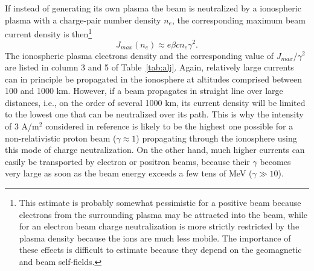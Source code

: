 \documentclass [12pt,a4paper,     ]{report} %
\begin{document}
  If instead of generating its own plasma the beam is neutralized by a ionospheric plasma with a charge-pair number density $n_e$, the corresponding maximum beam current density is then\footnote{This estimate is probably somewhat pessimistic for a positive beam because electrons from the surrounding plasma may be attracted into the beam, while for an electron beam charge neutralization is more strictly restricted by the plasma density because the ions are much less mobile.  The importance of these effects is difficult to estimate because they depend on the geomagnetic and beam self-fields.}
%
\begin{equation}\label{cnc:2} %
              J_{max}(n_e) \approx e \beta c n_e \gamma^2.
\end{equation}
%
The ionospheric plasma electrons density and the corresponding value of $J_{max}/\gamma^2$ are listed in column 3 and 5 of Table~\ref{tab:alj}.  Again, relatively large currents can in principle be propagated in the ionosphere at altitudes comprised between 100 and 1000 km.  However, if a beam propagates in straight line over large distances, i.e., on the order of several 1000 km, its current density will be limited to the lowest one that can be neutralized over its path.  This is why the  intensity of 3 A/m$^2$ considered in reference \cite{CHRIE1986-} is likely to be the highest one possible for a non-relativistic proton beam ($\gamma \approx 1$) propagating through the ionosphere using this mode of charge neutralization.  On the other hand, much higher currents can easily be transported by electron or positron beams, because their $\gamma$ becomes very large as soon as the beam energy exceeds a few tens of MeV ($\gamma \gg 10$).
\end{document}
